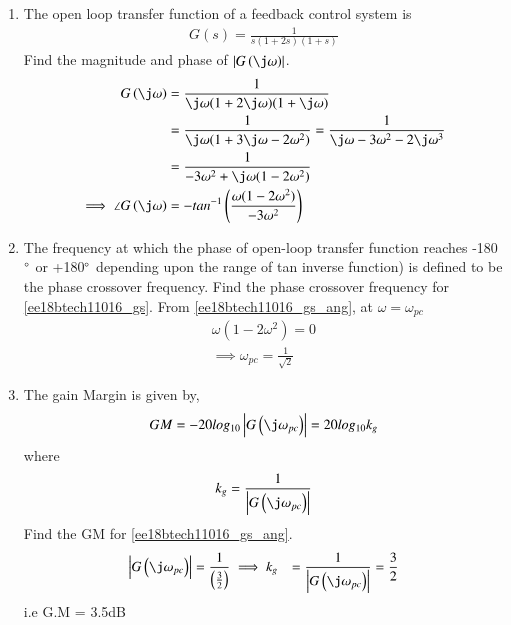 \begin{enumerate}[label=\thesection.\arabic*.,ref=\thesection.\theenumi]
\item The open loop transfer function of a feedback control system is  
\begin{align}
G(s) = \frac{1}{s(1+2s)(1+s)} 
\label{ee18btech11016_gs}
\end{align}
%
Find the magnitude and phase of $\abs{G\brak{\j\omega}}$.
\\
\solution
\begin{align}
G\brak{\j\omega} &= \frac{1}{\j\omega(1+2\j\omega)(1+\j\omega)} 
\\
 &= \frac{1}{\j\omega(1+3\j\omega-2\omega^2)}=\frac{1}{\j\omega-3\omega^2-2\j\omega^3}
\\
 &= \frac{1}{-3\omega^2+\j\omega(1-2\omega^2)} 
\\
\implies \angle G\brak{\j\omega}&=- tan^{-1}\brak{\frac{\omega(1-2\omega^2)}{-3\omega^2}}
\label{ee18btech11016_gs_ang}
\end{align}
%
\item The frequency at which the phase of open-loop transfer function reaches -180$\degree$ or +180$\degree$ depending upon the range of tan inverse function) is defined to be the phase crossover frequency.  Find the phase crossover frequency for  \eqref{ee18btech11016_gs}.
\solution From \eqref{ee18btech11016_gs_ang}, at $\omega=\omega_{pc}$ 
\begin{align}
\omega(1-2\omega^2) = 0 
\\
\implies \omega_{pc} = \frac{1}{\sqrt{2}} 
\end{align}
\item The gain Margin is given by,
\begin{align}
GM = -20log_{10}\abs{G\brak{\j\omega_{pc}}} = 20log_{10}k_{g}
\end{align}
where 
\begin{align}
k_{g}=\frac{1}{\abs{G\brak{\j\omega_{pc}}}} 
\end{align}
%
Find the GM for \eqref{ee18btech11016_gs_ang}.
\\
\solution 
\begin{align}
\abs{G\brak{\j\omega_{pc}}} &= \frac{1}{\brak{\frac{3}{2}}}
\implies k_{g}&=\frac{1}{\abs{G\brak{\j\omega_{pc}}}} = \frac{3}{2}
\end{align}
i.e G.M = 3.5dB
\\


\end{enumerate}
